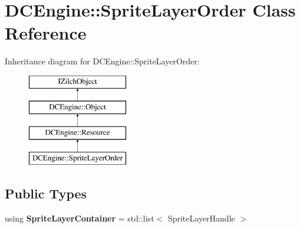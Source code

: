 \hypertarget{classDCEngine_1_1SpriteLayerOrder}{\section{D\-C\-Engine\-:\-:Sprite\-Layer\-Order Class Reference}
\label{classDCEngine_1_1SpriteLayerOrder}
}
Inheritance diagram for D\-C\-Engine\-:\-:Sprite\-Layer\-Order\-:\begin{figure}[H]
\begin{center}
\leavevmode
\includegraphics[height=4.000000cm]{classDCEngine_1_1SpriteLayerOrder}
\end{center}
\end{figure}
\subsection*{Public Types}
\begin{DoxyCompactItemize}
\item 
\hypertarget{classDCEngine_1_1SpriteLayerOrder_ad27856d78a35a55e1fee5fdfae60a007}{using {\bfseries Sprite\-Layer\-Container} = std\-::list$<$ Sprite\-Layer\-Handle $>$}\label{classDCEngine_1_1SpriteLayerOrder_ad27856d78a35a55e1fee5fdfae60a007}

\end{DoxyCompactItemize}
